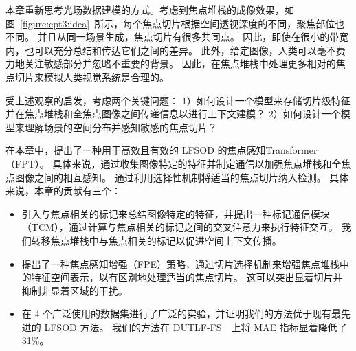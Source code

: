 本章重新思考光场数据建模的方式。考虑到焦点堆栈的成像效果，如图~\ref{figure:cpt3:idea}~所示，每个焦点切片根据空间透视深度的不同，聚焦部位也不同。 并且从同一场景生成，焦点切片有很多共同点。
因此，即使在很小的带宽内，也可以充分总结和传达它们之间的差异。 此外，给定图像，人类可以毫不费力地关注敏感部分并忽略不重要的背景。 因此，在焦点堆栈中处理更多相对的焦点切片来模拟人类视觉系统是合理的。 


受上述观察的启发，考虑两个关键问题：
1）如何设计一个模型来存储切片级特征并在焦点堆栈和全焦点图像之间传递信息以进行上下文建模？ 
2）如何设计一个模型来理解场景的空间分布并感知敏感的焦点切片？ 

在本章中，提出了一种用于高效且有效的 LFSOD 的焦点感知Transformer（FPT）。 
具体来说，通过收集图像特定的特征并制定通信以加强焦点堆栈和全焦点图像之间的相互感知。 
通过利用选择性机制将适当的焦点切片纳入检测。 
具体来说，本章的贡献有三个：



\begin{itemize}
	\item 引入与焦点相关的标记来总结图像特定的特征，并提出一种标记通信模块（TCM），通过计算与焦点相关的标记之间的交叉注意力来执行特征交互。 我们转移焦点堆栈中与焦点相关的标记以促进空间上下文传播。 
	
	\item 提出了一种焦点感知增强（FPE）策略，通过切片选择机制来增强焦点堆栈中的特征空间表示，以有区别地处理适当的焦点切片。	这可以突出显着切片并抑制非显着区域的干扰。 
	
	\item 在 4 个广泛使用的数据集进行了广泛的实验，并证明我们的方法优于现有最先进的 LFSOD 方法。 我们的方法在 DUTLF-FS~\cite{zhang2019memory}~上将 MAE 指标显着降低了 31\%。
\end{itemize}










